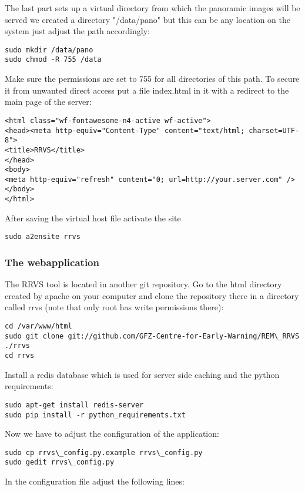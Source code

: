 \documentclass{article}
\begin{document}
The last part sets up a virtual directory from which the panoramic
images will be served we created a directory "/data/pano" but this
can be any location on the system just adjust the path accordingly:
\begin{verbatim}
sudo mkdir /data/pano
sudo chmod -R 755 /data
\end{verbatim}
Make sure the permissions are set to 755 for all directories of 
this path. To secure it from unwanted direct access put a 
file index.html in it with a redirect to the main page of the server:

\begin{verbatim}
<html class="wf-fontawesome-n4-active wf-active">
<head><meta http-equiv="Content-Type" content="text/html; charset=UTF-8"> 
<title>RRVS</title> 
</head>
<body>
<meta http-equiv="refresh" content="0; url=http://your.server.com" />
</body>
</html>
\end{verbatim}

After saving the virtual host file activate the site
\begin{verbatim}
sudo a2ensite rrvs
\end{verbatim}

\subsubsection{The webapplication}

The RRVS tool is located in another git repository. Go to
the html directory created by apache on your computer 
and clone the repository there in a directory called rrvs
(note that only root has write permissions there):
\begin{verbatim}
cd /var/www/html
sudo git clone git://github.com/GFZ-Centre-for-Early-Warning/REM\_RRVS ./rrvs
cd rrvs
\end{verbatim}

Install a redis database which is used for server side caching and
the python requirements:
\begin{verbatim}
sudo apt-get install redis-server
sudo pip install -r python_requirements.txt
\end{verbatim}

Now we have to adjust the configuration of the application:
\begin{verbatim}
sudo cp rrvs\_config.py.example rrvs\_config.py
sudo gedit rrvs\_config.py
\end{verbatim}

In the configuration file adjust the following lines:
\end{document}

